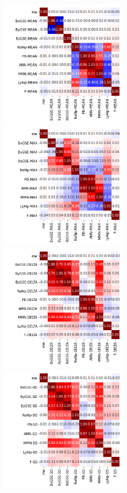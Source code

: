 \documentclass[12pt]{article}
\begin{document}
\newpage


\begin{figure}
   \includegraphics[width=0.57\textwidth]{all_mean_2.png}
   \includegraphics[width=0.57\textwidth]{all_max_2.png}
   \includegraphics[width=0.57\textwidth]{all_delta_2.png}
   \includegraphics[width=0.57\textwidth]{all_sd_2.png}
\end{figure}
\end{document}
